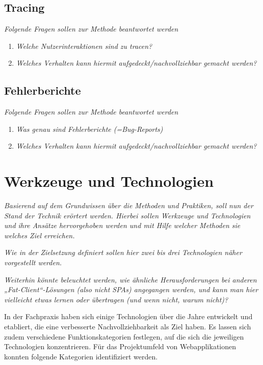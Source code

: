 \subsection{Tracing}

\textit{Folgende Fragen sollen zur Methode beantwortet werden}
\begin{enumerate}
	\item \textit{Welche Nutzerinteraktionen sind zu tracen?}
	\item \textit{Welches Verhalten kann hiermit aufgedeckt/nachvollziehbar gemacht werden?}
\end{enumerate}

\subsection{Fehlerberichte}

\textit{Folgende Fragen sollen zur Methode beantwortet werden}
\begin{enumerate}
	\item \textit{Was genau sind Fehlerberichte (=Bug-Reports) }
	\item \textit{Welches Verhalten kann hiermit aufgedeckt/nachvollziehbar gemacht werden?}
\end{enumerate}

\section{Werkzeuge und Technologien}

\textit{Basierend auf dem Grundwissen über die Methoden und Praktiken, soll nun der Stand der Technik erörtert werden. Hierbei sollen Werkzeuge und Technologien und ihre Ansätze hervorgehoben werden und mit Hilfe welcher Methoden sie welches Ziel erreichen.}

\textit{Wie in der Zielsetzung definiert sollen hier zwei bis drei Technologien näher vorgestellt werden.}

\textit{Weiterhin könnte beleuchtet werden, wie ähnliche Herausforderungen bei anderen „Fat-Client“-Lösungen (also nicht SPAs) angegangen werden, und kann man hier vielleicht etwas lernen oder übertragen (und wenn nicht, warum nicht)?}

In der Fachpraxis haben sich einige Technologien über die Jahre entwickelt und etabliert, die eine verbesserte Nachvollziehbarkeit als Ziel haben. Es lassen sich zudem verschiedene Funktionskategorien festlegen, auf die sich die jeweiligen Technologien konzentrieren. Für das Projektumfeld von Webapplikationen konnten folgende Kategorien identifiziert werden.

